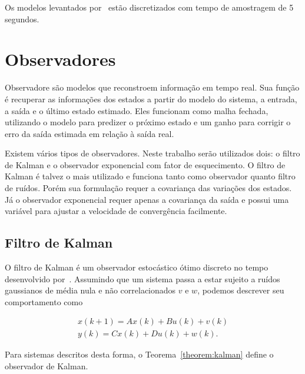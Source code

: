 Os modelos levantados por~\textcite{masterthesis:nelson} estão discretizados com
tempo de amostragem de 5 segundos.

\section{Observadores}%
\label{sec:observers}

Observadore são modelos que reconstroem informação em tempo real. Sua função é
recuperar as informações dos estados a partir do modelo do sistema, a entrada, a
saída e o último estado estimado. Eles funcionam como malha fechada, utilizando
o modelo para predizer o próximo estado e um ganho para corrigir o erro da saída
estimada em relação à saída real.

Existem vários tipos de observadores. Neste trabalho serão utilizados dois: o
filtro de Kalman e o observador exponencial com fator de esquecimento. O filtro
de Kalman é talvez o mais utilizado e funciona tanto como observador quanto
filtro de ruídos. Porém sua formulação requer a covariança das variações dos
estados. Já o observador exponencial requer apenas a covariança da saída e
possui uma variável para ajustar a velocidade de convergência facilmente.

\subsection{Filtro de Kalman}%
\label{subsec:kalman}

O filtro de Kalman é um observador estocástico ótimo discreto no tempo
desenvolvido por~\textcite{Kalman1960}. Assumindo que um sistema passa a estar
sujeito a ruídos gaussianos de média nula e não correlacionados \( v \) e \( w
\), podemos descrever seu comportamento como

\begin{equation}
	\label{eq:observer-noisy-model}
	\begin{split}
		x(k+1) = Ax(k) + Bu(k) + v(k) \\
		y(k) = Cx(k) +Du(k) + w(k).
	\end{split}
\end{equation}

Para sistemas descritos desta forma, o Teorema~\ref{theorem:kalman} define o
observador de Kalman.

